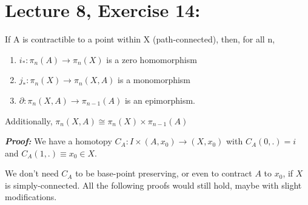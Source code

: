 \documentclass[11pt]{article}
\numberwithin{equation}{section}
\begin{document}
\section{\normalsize{Lecture 8, Exercise 14:}}
\begin{thm}
If A is contractible to a point within X (path-connected), then, for all n,
\begin{enumerate}
	\item $i_{*}:\pi_n(A)\rightarrow \pi_n(X)$ is a zero homomorphism
	\item $j_{*}:\pi_n(X)\rightarrow\pi_n(X,A)$ is a monomorphism
	\item $\partial: \pi_n(X,A)\rightarrow \pi_{n-1}(A)$ is an epimorphism.
\end{enumerate}
Additionally, $\pi_n(X,A)\cong \pi_n(X)\times\pi_{n-1}(A)$
\end{thm}
\textbf{\emph{Proof:}} We have a homotopy $C_A:I\times (A,x_0)\rightarrow (X,x_0)$ with $C_A(0,.)=i$ and $C_A(1,.)\equiv x_0\in X$. 
\begin{rem}
	We don't need $C_A$ to be base-point preserving, or even to contract $A$ to $x_0$, if $X$ is simply-connected. All the following proofs would still hold, maybe with slight modifications. 
\end{rem}
\end{document}
